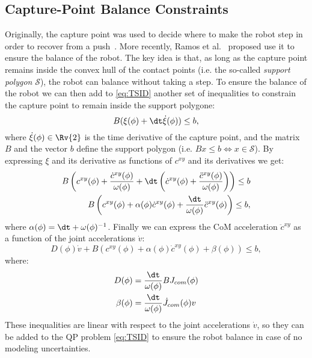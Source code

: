 \subsection{Capture-Point Balance Constraints}
Originally, the capture point was used to decide where to make the robot step in order to recover from a push~\cite{Pratt2006}.
More recently, Ramos et al.~\cite{Ramos2014a} proposed use it to ensure the balance of the robot.
The key idea is that, as long as the capture point remains inside the convex hull of the contact points (i.e. the so-called \emph{support polygon} $\mathcal{S}$), the robot can balance without taking a step. 
To ensure the balance of the robot we can then add to \eqref{eq:TSID} another set of inequalities to constrain the capture point to remain inside the support polygone:
$$
B (\xi(\phi) + \dt \dot{\xi}(\phi))  \le b,
$$
where $\dot{\xi}(\phi) \in \Rv{2}$ is the time derivative of the capture point, and the matrix $B$ and the vector $b$ define the support polygon (i.e. $B x \le b \Longleftrightarrow x \in \mathcal{S}$).
By expressing $\xi$ and its derivative as functions of $c^{xy}$ and its derivatives we get:
\begin{align*}
B \left ( c^{xy}(\phi) + \frac{\dot{c}^{xy}(\phi)}{\omega(\phi)} + \dt \left( \dot{c}^{xy}(\phi) + \frac{\ddot{c}^{xy}(\phi)}{\omega(\phi)} \right) \right)  \le b \\
B \left ( c^{xy}(\phi) + \alpha(\phi) \dot{c}^{xy}(\phi) + \frac{\dt}{\omega(\phi)} \ddot{c}^{xy}(\phi) \right)  \le b,
\end{align*}
where $\alpha(\phi) = \dt + \omega(\phi)^{-1}$.
Finally we can express the CoM acceleration $\ddot{c}^{xy}$ as a function of the joint accelerations $\dot{v}$:
\begin{equation} \label{eq:cp_ineq}
D(\phi) \dot{v} + B \left (c^{xy}(\phi) + \alpha(\phi) \dot{c}^{xy}(\phi) + \beta(\phi) \right ) \le b,
\end{equation}
where: 
\begin{align*}
D(\phi) &= \frac{\dt}{\omega(\phi)} B J_{com}(\phi) \\
\beta(\phi) &= \frac{\dt}{\omega(\phi)} \dot{J}_{com}(\phi) v
\end{align*}
These inequalities are linear with respect to the joint accelerations $\dot{v}$, so they can be added to the QP problem \eqref{eq:TSID} to ensure the robot balance in case of no modeling uncertainties.



